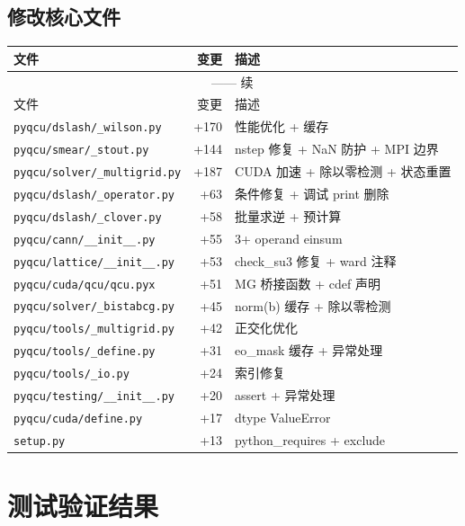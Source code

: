 \documentclass[11pt,a4paper]{article}
\begin{document}
\subsection{修改核心文件}

\begin{longtable}{lrl}
\toprule
文件 & 变更 & 描述 \\
\midrule
\endfirsthead
\multicolumn{3}{c}{\tablename{} \thetable{} —— 续} \\
\midrule
文件 & 变更 & 描述 \\
\midrule
\endhead
\bottomrule
\endfoot
\texttt{pyqcu/dslash/\_wilson.py} & +170 & 性能优化 + 缓存 \\
\texttt{pyqcu/smear/\_stout.py} & +144 & nstep 修复 + NaN 防护 + MPI 边界 \\
\texttt{pyqcu/solver/\_multigrid.py} & +187 & CUDA 加速 + 除以零检测 + 状态重置 \\
\texttt{pyqcu/dslash/\_operator.py} & +63 & 条件修复 + 调试 print 删除 \\
\texttt{pyqcu/dslash/\_clover.py} & +58 & 批量求逆 + 预计算 \\
\texttt{pyqcu/cann/\_\_init\_\_.py} & +55 & 3+ operand einsum \\
\texttt{pyqcu/lattice/\_\_init\_\_.py} & +53 & check\_su3 修复 + ward 注释 \\
\texttt{pyqcu/cuda/qcu/qcu.pyx} & +51 & MG 桥接函数 + cdef 声明 \\
\texttt{pyqcu/solver/\_bistabcg.py} & +45 & norm(b) 缓存 + 除以零检测 \\
\texttt{pyqcu/tools/\_multigrid.py} & +42 & 正交化优化 \\
\texttt{pyqcu/tools/\_define.py} & +31 & eo\_mask 缓存 + 异常处理 \\
\texttt{pyqcu/tools/\_io.py} & +24 & 索引修复 \\
\texttt{pyqcu/testing/\_\_init\_\_.py} & +20 & assert + 异常处理 \\
\texttt{pyqcu/cuda/define.py} & +17 & dtype ValueError \\
\texttt{setup.py} & +13 & python\_requires + exclude \\
\end{longtable}

\section{测试验证结果}
\end{document}
